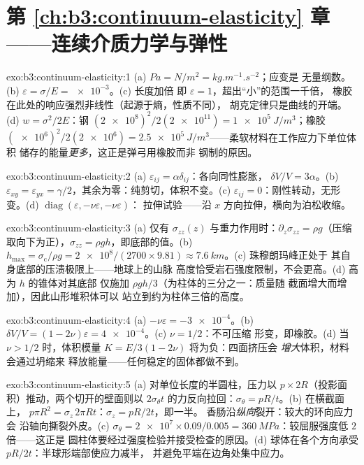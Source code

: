 \section*{第 \ref{ch:b3:continuum-elasticity} 章——连续介质力学与弹性}

\begin{solution}{exo:b3:continuum-elasticity:1}
(a) $\unit{Pa} = \unit{N/m^2} = \unit{kg.m^{-1}.s^{-2}}$；应变是
无量纲数。(b) $\varepsilon = \sigma/E = \num{e-3}$。(c) 长度加倍
即 $\varepsilon = 1$，超出“小”的范围一千倍，
橡胶在此处的响应强烈非线性（起源于熵，性质不同），
胡克定律只是曲线的开端。(d) $w =
\sigma^2/2E$：钢 $(\num{2e8})^2/2(\num{2e11}) =
\qty{1e5}{J/m^3}$；橡胶 $(\num{e6})^2/2(\num{2e6}) =
\qty{2.5e5}{J/m^3}$——柔软材料在工作应力下单位体积
储存的能量\emph{更多}，这正是弹弓用橡胶而非
钢制的原因。
\end{solution}

\begin{solution}{exo:b3:continuum-elasticity:2}
(a) $\varepsilon_{ij} = \alpha\delta_{ij}$：各向同性膨胀，
$\delta V/V = 3\alpha$。(b) $\varepsilon_{xy} = \varepsilon_{yx} =
\gamma/2$，其余为零：纯剪切，体积不变。(c)
$\varepsilon_{ij} = 0$：刚性转动，无形变。(d)
$\operatorname{diag}(\varepsilon, -\nu\varepsilon, -\nu\varepsilon)$：
拉伸试验——沿 $x$ 方向拉伸，横向为泊松收缩。
\end{solution}

\begin{solution}{exo:b3:continuum-elasticity:3}
(a) 仅有 $\sigma_{zz}(z)$ 与重力作用时：$\partial_z\sigma_{zz} =
\rho g$（压缩取向下为正），$\sigma_{zz} = \rho
gh$，即底部的值。(b) $h_{\max} = \sigma_{\text{c}}/\rho g =
\num{2e8}/(2700 \times 9.81) \approx \qty{7.6}{km}$。(c) 珠穆朗玛峰正处于
其自身底部的压溃极限上——地球上的山脉
高度恰受岩石强度限制，不会更高。(d) 高为 $h$ 的锥体对其底部
仅施加 $\rho gh/3$（为柱体的三分之一：质量随
截面增大而增加），因此山形堆积体可以
站立到约为柱体三倍的高度。
\end{solution}

\begin{solution}{exo:b3:continuum-elasticity:4}
(a) $-\nu\varepsilon = \num{-3e-4}$。(b) $\delta V/V = (1 -
2\nu)\varepsilon = \num{4e-4}$。(c) $\nu = 1/2$：不可压缩
形变，即橡胶。(d) 当 $\nu > 1/2$ 时，体积模量 $K =
E/3(1 - 2\nu)$ 将为负：四面挤压会
\emph{增大}体积，材料会通过坍缩来
释放能量——任何稳定的固体都做不到。
\end{solution}

\begin{solution}{exo:b3:continuum-elasticity:5}
(a) 对单位长度的半圆柱，压力以 $p
\times 2R$（投影面积）推动，两个切开的壁面则以
$2\sigma_\theta t$ 的力反向拉回：$\sigma_\theta = pR/t$。(b) 在横截面上，
$p\pi R^2 = \sigma_z\,2\pi Rt$：$\sigma_z = pR/2t$，即一半。
香肠沿\emph{纵向}裂开：较大的环向应力会
沿轴向撕裂外皮。(c) $\sigma_\theta = \num{2e7} \times
0.09/0.005 = \qty{360}{MPa}$：较屈服强度低 $2$ 倍——这正是
圆柱体要经过强度检验并接受检查的原因。(d) 球体在各个方向承受
$pR/2t$：半球形端部使应力减半，
并避免平端在边角处集中应力。
\end{solution}

